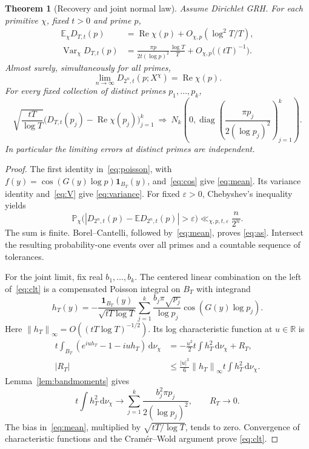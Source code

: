 \documentclass[11pt]{article}
\newtheorem{theorem}{Theorem}[section]
\theoremstyle{definition}
\newcommand{\R}{\mathbb R}
\newcommand{\E}{\mathbb E}
\newcommand{\Prob}{\mathbb P}
\newcommand{\Var}{\operatorname{Var}}
\newcommand{\Rea}{\operatorname{Re}}
\newcommand{\dd}{\,\mathrm d}
\newcommand{\ind}{\mathbf 1}
\newcommand{\abs}[1]{\left|#1\right|}
\newcommand{\norm}[1]{\left\lVert#1\right\rVert}
\begin{document}
\begin{theorem}[Recovery and joint normal law]\label{thm:decoder}
Assume Dirichlet GRH. For each primitive $\chi$, fixed $t>0$ and prime $p$,
\begin{align}
 \E_\chi D_{T,t}(p)
  &=\Rea\chi(p)+O_{\chi,p}(\log^2 T/T),\label{eq:mean}\\
 \Var_\chi D_{T,t}(p)
  &=\frac{\pi p}{2t(\log p)^2}\frac{\log T}{T}
       +O_{\chi,p}\bigl((tT)^{-1}\bigr).\label{eq:variance}
\end{align}
Almost surely, simultaneously for all primes,
\begin{equation}\label{eq:as}
 \lim_{n\to\infty}D_{2^n,t}(p;X^\chi)=\Rea\chi(p).
\end{equation}
For every fixed collection of distinct primes $p_1,\ldots,p_k$,
\begin{equation}\label{eq:clt}
 \sqrt{\frac{tT}{\log T}}
  \bigl(D_{T,t}(p_j)-\Rea\chi(p_j)\bigr)_{j=1}^k
 \ \Longrightarrow\
 N_k\!\left(0,\operatorname{diag}
       \left(\frac{\pi p_j}{2(\log p_j)^2}\right)_{j=1}^k\right).
\end{equation}
In particular the limiting errors at distinct primes are independent.
\end{theorem}

\begin{proof}
The first identity in~\eqref{eq:poisson}, with
$f(y)=\cos(G(y)\log p)\ind_{B_T}(y)$, and~\eqref{eq:cos} give
\eqref{eq:mean}. Its variance identity and~\eqref{eq:V} give
\eqref{eq:variance}. For fixed $\varepsilon>0$, Chebyshev's inequality yields
\[
 \Prob_\chi\bigl(\abs{D_{2^n,t}(p)-\E D_{2^n,t}(p)}>
      \varepsilon\bigr)
 \ll_{\chi,p,t,\varepsilon}\frac n{2^n}.
\]
The sum is finite. Borel--Cantelli, followed by~\eqref{eq:mean}, proves
\eqref{eq:as}. Intersect the resulting probability-one events over all primes
and a countable sequence of tolerances.

For the joint limit, fix real $b_1,\ldots,b_k$. The centered linear combination
on the left of~\eqref{eq:clt} is a compensated Poisson integral on $B_T$ with
integrand
\[
 h_T(y)=-\frac{\ind_{B_T}(y)}{\sqrt{tT\log T}}
       \sum_{j=1}^k\frac{b_j\pi\sqrt{p_j}}{\log p_j}
                   \cos(G(y)\log p_j).
\]
Here $\norm{h_T}_\infty=O((tT\log T)^{-1/2})$. Its log characteristic
function at $u\in\R$ is
\begin{align*}
 t\int_{B_T}(e^{iuh_T}-1-iuh_T)\dd\nu_\chi
   &=-\frac{u^2}2t\int h_T^2\dd\nu_\chi+R_T,\\
 \abs{R_T}&\le\frac{\abs u^3}6\norm{h_T}_\infty
                       t\int h_T^2\dd\nu_\chi.
\end{align*}
Lemma~\ref{lem:bandmoments} gives
\[
 t\int h_T^2\dd\nu_\chi
   \longrightarrow\sum_{j=1}^k
          \frac{b_j^2\pi p_j}{2(\log p_j)^2},
 \qquad R_T\longrightarrow0.
\]
The bias in~\eqref{eq:mean}, multiplied by $\sqrt{tT/\log T}$, tends to zero.
Convergence of characteristic functions and the Cram\'er--Wold argument prove
\eqref{eq:clt}.
\end{proof}
\end{document}
